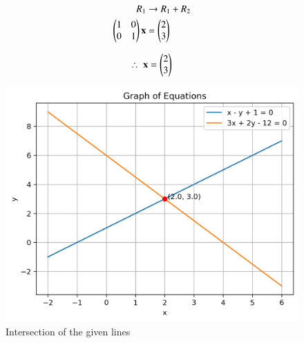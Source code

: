 \documentclass[journal]{IEEEtran}
\begin{document}
	\begin{align}
	R_1 &\to R_1 + R_2 \\
		\begin{pmatrix}1 & 0 \\ 0 & 1\end{pmatrix}\mathbf{x} &= \begin{pmatrix}2 \\ 3\end{pmatrix}
	\end{align}
	
	\begin{align}
		\therefore \; \mathbf{x} = \begin{pmatrix}2 \\ 3\end{pmatrix}
	\end{align}
	
	\begin{figure}[H]
		\centering
		\includegraphics[width=1\linewidth]{figs/equations_solution}
		\caption{Intersection of the given lines}
		\label{fig:equationssolution}
	\end{figure}
	
\end{document}
